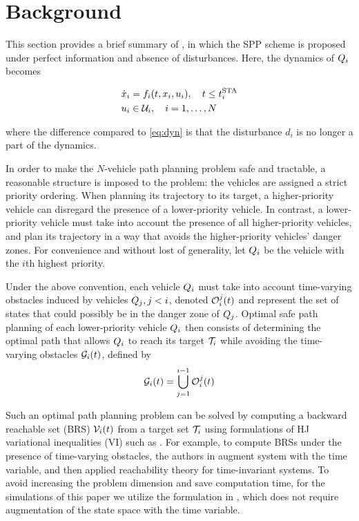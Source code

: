 \section{Background \label{sec:background}}
This section provides a brief summary of \cite{Chen15}, in which the SPP scheme is proposed under perfect information and absence of disturbances. Here, the dynamics of $Q_i$ becomes

\begin{equation}
\label{eq:dyn_no_dstb}
\begin{aligned}
\dot{x}_i &= f_i(t, x_i, u_i), \quad t \le t^\text{STA}_i \\
u_i &\in \mathcal{U}_i, \quad i = 1,\ldots, N
\end{aligned}
\end{equation}

\noindent where the difference compared to \eqref{eq:dyn} is that the disturbance $d_i$ is no longer a part of the dynamics.

In order to make the $N$-vehicle path planning problem safe and tractable, a reasonable structure is imposed to the problem: the vehicles are assigned a strict priority ordering. When planning its trajectory to its target, a higher-priority vehicle can disregard the presence of a lower-priority vehicle. In contrast, a lower-priority vehicle must take into account the presence of all higher-priority vehicles, and plan its trajectory in a way that avoids the higher-priority vehicles' danger zones. For convenience and without lost of generality, let $Q_i$ be the vehicle with the $i$th highest priority. 

Under the above convention, each vehicle $Q_i$ must take into account time-varying obstacles induced by vehicles $Q_j, j<i$, denoted $\mathcal{O}_i^j(t)$ and represent the set of states that could possibly be in the danger zone of $Q_j$. Optimal safe path planning of each lower-priority vehicle $Q_i$ then consists of determining the optimal path that allows $Q_i$ to reach its target $\mathcal{T}_i$ while avoiding the time-varying obstacles $\mathcal{G}_i(t)$, defined by
\vspace{-1em}
\begin{equation}
\label{eq:ioset}
\mathcal{G}_i(t) = \bigcup_{j=1}^{i-1}\mathcal{O}_i^j(t)
\end{equation}

Such an optimal path planning problem can be solved by computing a backward reachable set (BRS) $\mathcal{V}_i(t)$ from a target set $\mathcal{T}_i$ using formulations of HJ variational inequalities (VI) such as \cite{Barron90, Bokanowski10, Bokanowski11, Fisac15}. For example, to compute BRSs under the presence of time-varying obstacles, the authors in \cite{Bokanowski11} augment system with the time variable, and then applied reachability theory for time-invariant systems. To avoid increasing the problem dimension and save computation time, for the simulations of this paper we utilize the formulation in \cite{Fisac15}, which does not require augmentation of the state space with the time variable.


